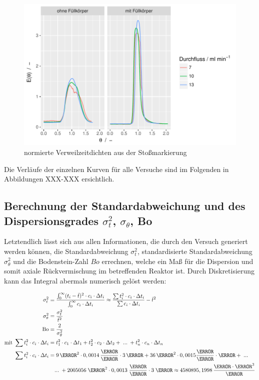 \documentclass[12pt,liststotoc]{report}
\begin{document}
\begin{figure}[H]
\centering
\includegraphics[width=1\textwidth]{Graphics/E_theta_stoss.pdf}
\caption[normierte Verweilzeitdichte Stoßmarkierungen]{normierte Verweilzeitdichten aus der Stoßmarkierung}
\label{dichte_stoß_norm}
\end{figure}
\noindent


Die Verläufe der einzelnen Kurven für alle Versuche sind im Folgenden in Abbildungen XXX-XXX ersichtlich. 


\subsection{Berechnung der Standardabweichung und des Dispersionsgrades $\sigma^{2}_{t}$, $\sigma_\theta$, Bo}

Letztendlich lässt sich aus allen Informationen, die durch den Versuch generiert werden können, die Standardabweichung $\sigma^{2}_t$, standardisierte Standardabweichung $\sigma^{2}_\theta$ und die Bodenstein-Zahl $Bo$ errechnen, welche ein Maß für die Dispersion und somit axiale Rückvermischung im betreffenden Reaktor ist. Durch Diskretisierung kann das Integral abermals numerisch gelöst werden:

\begin{align}
\sigma^{2}_t =&\;\frac{\int_{0}^{\infty}(t_i-\bar{t})^2\cdot c_i \cdot\Delta t_i}{\int_{0}^{\infty}c_i\cdot\Delta t_i} \approx \frac{\sum t_{i}^2\cdot c_i \cdot\Delta t_i}{\sum c_i\cdot\Delta t_i} - \bar{t}^2\\
\sigma_\theta^2 =&\;\frac{\sigma^{2}_t}{\bar{t}^2}\\
\text{Bo} =&\; \frac{2}{\sigma_\theta^2}\\
\text{mit } \sum t_{i}^2\cdot c_i \cdot\Delta t_i =&\; t_{1}^2\cdot c_1 \cdot\Delta t_1 + t_{2}^2\cdot c_2 \cdot\Delta t_2+\;...\;+t_{n}^2\cdot c_n \cdot\Delta t_n\\
\sum t_{i}^2\cdot c_i \cdot\Delta t_i =&\; 9\,\s^2\cdot 0,0014\,\frac{\mole}{\litre} \cdot 3\,\s + 36\,\s^2\cdot 0,0015\frac{\mole}{\litre} \cdot \s+\;...\nonumber\\\notag
&...\;+ 2005056\;\s^2\cdot 0,0013\;\frac{\mole}{\litre} \cdot 3\;\s \approx 4580895,1998\,\frac{\mole \cdot \s^3}{\litre}\notag
\end{align}
\end{document}
